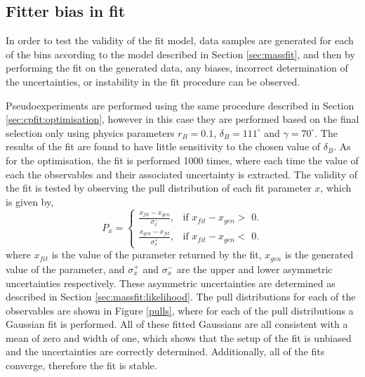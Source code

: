 \subsection{Fitter bias in \CP fit}
\label{sec:cpfit:fitterbias}

In order to test the validity of the \CP fit model, data samples are generated for each of the bins according to the model described in Section \ref{sec:massfit}, and then by performing the \CP fit on the generated data, any biases, incorrect determination of the uncertainties, or instability in the \CP fit procedure can be observed. 

Pseudoexperiments are performed using the same procedure described in Section \ref{sec:cpfit:optimisation}, however in this case they are performed based on the final selection only using physics parameters $r_B = 0.1$, $\delta_B = 111^{\circ}$ and $\gamma = 70^{\circ}$. The results of the fit are found to have little sensitivity to the chosen value of $\delta_B$. As for the optimisation, the \CP fit is performed 1000 times, where each time the value of each the \CP observables and their associated uncertainty is extracted. The validity of the fit is tested by observing the pull distribution of each fit parameter $x$, which is given by,
\begin{equation*}
P_x = \begin{cases}
	\frac{x_{fit} - x_{gen}}{\sigma_x^-}, & \text{if $x_{fit} - x_{gen} >$ 0}. \\
	\frac{x_{gen} - x_{fit}}{\sigma_x^+}, & \text{if $x_{fit} - x_{gen} <$ 0}.
	\end{cases}
\end{equation*}
where $x_{fit}$ is the value of the parameter returned by the fit, $x_{gen}$ is the generated value of the parameter, and $\sigma_x^+$ and $\sigma_x^-$ are the upper and lower asymmetric uncertainties respectively. These asymmetric uncertainties are determined as described in Section \ref{sec:massfit:likelihood}. The pull distributions for each of the \CP observables are shown in Figure \ref{pulls}, where for each of the pull distributions a Gaussian fit is performed. All of these fitted Gaussians are all consistent with a mean of zero and width of one, which shows that the setup of the \CP fit is unbiased and the uncertainties are correctly determined. Additionally, all of the fits converge, therefore the fit is stable. 
 
